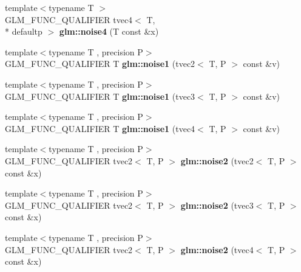 \begin{DoxyCompactItemize}
\item 
\hypertarget{namespaceglm_a166fad35b17fd8ff59cd45fb8978616e}{{\footnotesize template$<$typename T $>$ }\\G\-L\-M\-\_\-\-F\-U\-N\-C\-\_\-\-Q\-U\-A\-L\-I\-F\-I\-E\-R tvec4$<$ T, \\*
defaultp $>$ {\bfseries glm\-::noise4} (T const \&x)}\label{namespaceglm_a166fad35b17fd8ff59cd45fb8978616e}

\item 
\hypertarget{namespaceglm_aa3d6d73c8a0b8631f05295f3e6efa13e}{{\footnotesize template$<$typename T , precision P$>$ }\\G\-L\-M\-\_\-\-F\-U\-N\-C\-\_\-\-Q\-U\-A\-L\-I\-F\-I\-E\-R T {\bfseries glm\-::noise1} (tvec2$<$ T, P $>$ const \&v)}\label{namespaceglm_aa3d6d73c8a0b8631f05295f3e6efa13e}

\item 
\hypertarget{namespaceglm_a19e4f19f1667310f9aa6866bd56fb1d9}{{\footnotesize template$<$typename T , precision P$>$ }\\G\-L\-M\-\_\-\-F\-U\-N\-C\-\_\-\-Q\-U\-A\-L\-I\-F\-I\-E\-R T {\bfseries glm\-::noise1} (tvec3$<$ T, P $>$ const \&v)}\label{namespaceglm_a19e4f19f1667310f9aa6866bd56fb1d9}

\item 
\hypertarget{namespaceglm_aa51a3bde3c61f286ed9562b0878c8def}{{\footnotesize template$<$typename T , precision P$>$ }\\G\-L\-M\-\_\-\-F\-U\-N\-C\-\_\-\-Q\-U\-A\-L\-I\-F\-I\-E\-R T {\bfseries glm\-::noise1} (tvec4$<$ T, P $>$ const \&v)}\label{namespaceglm_aa51a3bde3c61f286ed9562b0878c8def}

\item 
\hypertarget{namespaceglm_acf8fbd744b051bafa3c1425d215b1df6}{{\footnotesize template$<$typename T , precision P$>$ }\\G\-L\-M\-\_\-\-F\-U\-N\-C\-\_\-\-Q\-U\-A\-L\-I\-F\-I\-E\-R tvec2$<$ T, P $>$ {\bfseries glm\-::noise2} (tvec2$<$ T, P $>$ const \&x)}\label{namespaceglm_acf8fbd744b051bafa3c1425d215b1df6}

\item 
\hypertarget{namespaceglm_aa0abee4042d09050a1bbfb4241fcc529}{{\footnotesize template$<$typename T , precision P$>$ }\\G\-L\-M\-\_\-\-F\-U\-N\-C\-\_\-\-Q\-U\-A\-L\-I\-F\-I\-E\-R tvec2$<$ T, P $>$ {\bfseries glm\-::noise2} (tvec3$<$ T, P $>$ const \&x)}\label{namespaceglm_aa0abee4042d09050a1bbfb4241fcc529}

\item 
\hypertarget{namespaceglm_a20261763d29b03c2b3e979e6ff34824b}{{\footnotesize template$<$typename T , precision P$>$ }\\G\-L\-M\-\_\-\-F\-U\-N\-C\-\_\-\-Q\-U\-A\-L\-I\-F\-I\-E\-R tvec2$<$ T, P $>$ {\bfseries glm\-::noise2} (tvec4$<$ T, P $>$ const \&x)}\label{namespaceglm_a20261763d29b03c2b3e979e6ff34824b}


\end{DoxyCompactItemize}
